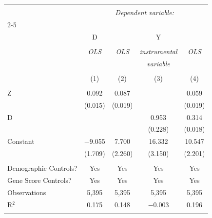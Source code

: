 
\begin{tabular}{@{\extracolsep{5pt}}lcccc} 
\\[-1.8ex]\hline 
\hline \\[-1.8ex] 
 & \multicolumn{4}{c}{\textit{Dependent variable:}} \\ 
\cline{2-5} 
\\[-1.8ex] & D & \multicolumn{3}{c}{Y} \\ 
\\[-1.8ex] & \textit{OLS} & \textit{OLS} & \textit{instrumental} & \textit{OLS} \\ 
 & \textit{} & \textit{} & \textit{variable} & \textit{} \\ 
\\[-1.8ex] & (1) & (2) & (3) & (4)\\ 
\hline \\[-1.8ex] 
 Z & 0.092 & 0.087 &  & 0.059 \\ 
  & (0.015) & (0.019) &  & (0.019) \\ 
  D &  &  & 0.953 & 0.314 \\ 
  &  &  & (0.228) & (0.018) \\ 
  Constant & $-$9.055 & 7.700 & 16.332 & 10.547 \\ 
  & (1.709) & (2.260) & (3.150) & (2.201) \\ 
 \hline \\[-1.8ex] 
Demographic Controls? & Yes & Yes & Yes & Yes \\ 
Gene Score Controls? & Yes & Yes & Yes & Yes \\ 
Observations & 5,395 & 5,395 & 5,395 & 5,395 \\ 
R$^{2}$ & 0.175 & 0.148 & $-$0.003 & 0.196 \\ 
\hline 
\hline \\[-1.8ex] 
\end{tabular} 

